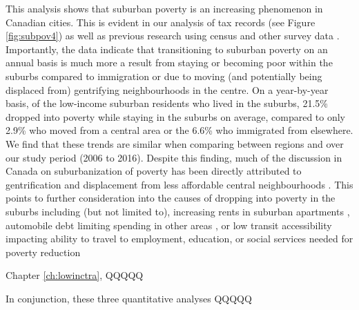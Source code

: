 This analysis shows that suburban poverty is an increasing phenomenon in Canadian cities. This is evident in our analysis of tax records (see Figure \ref{fig:subpov4}) as well as previous research using census and other survey data \cite{ades_are_2012,breau_pulling_2018,grant_changing_2020,allen_suburbanization_2021}. Importantly, the data indicate that transitioning to suburban poverty on an annual basis is much more a result from staying or becoming poor within the suburbs compared to immigration or due to moving (and potentially being displaced from) gentrifying neighbourhoods in the centre. On a year-by-year basis, of the low-income suburban residents who lived in the suburbs, 21.5\% dropped into poverty while staying in the suburbs on average, compared to only 2.9\% who moved from a central area or the 6.6\% who immigrated from elsewhere. We find that these trends are similar when comparing between regions and over our study period (2006 to 2016). Despite this finding, much of the discussion in Canada on suburbanization of poverty has been directly attributed to gentrification and displacement from less affordable central neighbourhoods \cite{grant_changing_2020}. This points to further consideration into the causes of dropping into poverty in the suburbs including (but not limited to), increasing rents in suburban apartments \cite{august_gentrification_2018}, automobile debt limiting spending in other areas \cite{walks_driving_2018}, or low transit accessibility impacting ability to travel to employment, education, or social services needed for poverty reduction \cite{allen_planning_2020} 

Chapter \ref{ch:lowinctra}, QQQQQ



In conjunction, these three quantitative analyses QQQQQ












